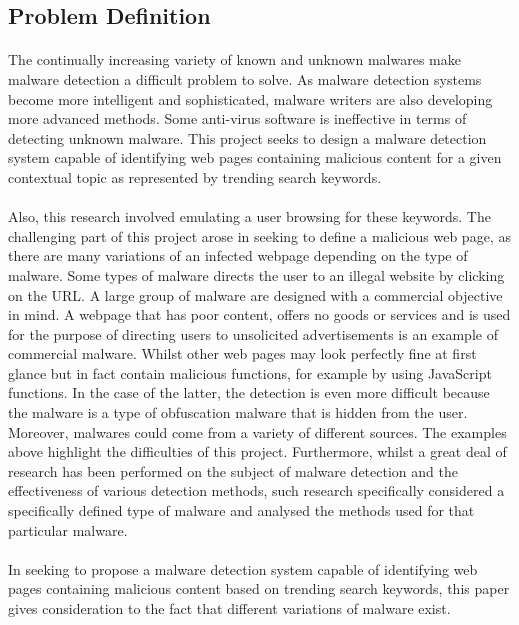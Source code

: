 \subsection{Problem Definition}

\paragraph{} 
The continually increasing variety of known and unknown malwares make malware detection a difficult problem to solve. As malware detection systems become more intelligent and sophisticated, malware writers are also developing more advanced methods. Some anti-virus software is ineffective in terms of detecting unknown malware. This project seeks to design a malware detection system capable of identifying web pages containing malicious content for a given contextual topic as represented by trending search keywords. 

\paragraph{} 
Also, this research involved emulating a user browsing for these keywords. The challenging part of this project arose in seeking to define a malicious web page, as there are many variations of an infected webpage depending on the type of malware. 
Some types of malware directs the user to an illegal website by clicking on the URL. A large group of malware are designed with a commercial objective in mind. A webpage that has poor content, offers no goods or services and is used for the purpose of directing users to unsolicited advertisements is an example of commercial malware. Whilst other web pages may look perfectly fine at first glance but in fact contain malicious functions, for example by using JavaScript functions. In the case of the latter, the detection is even more difficult because the malware is a type of obfuscation malware that is hidden from the user. Moreover, malwares could come from a variety of different sources.
The examples above highlight the difficulties of this project. Furthermore, whilst a great deal of research has been performed on the subject of malware detection and the effectiveness of various detection methods, such research specifically considered a specifically defined type of malware and analysed the methods used for that particular malware. 

\paragraph{} 
In seeking to propose a malware detection system capable of identifying web pages containing malicious content based on trending search keywords, this paper gives consideration to the fact that different variations of malware exist. 
